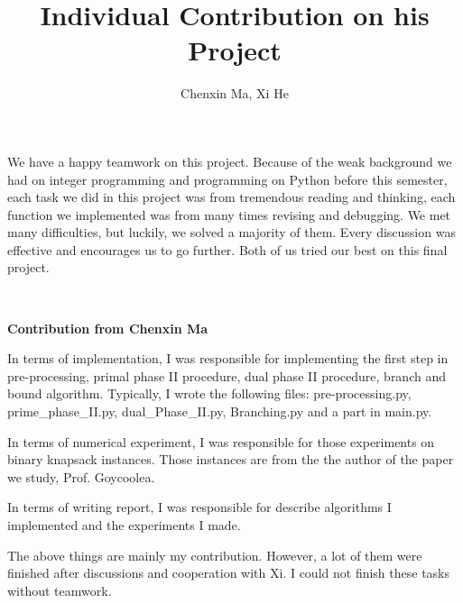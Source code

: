 \documentclass[a4paper,10pt]{article}
\title{Individual Contribution on his Project}
\author{Chenxin Ma, Xi He}
\begin{document}
\maketitle
 
We have a happy teamwork on this project. Because of the weak background we had on integer programming and programming on Python before this semester, each task we did in this project was from tremendous reading and thinking, each function we implemented was from many times revising and debugging. We met many difficulties, but luckily, we solved a majority of them. Every discussion was effective and encourages us to go further.  Both of us tried our best on this final project.   

~\\
\centerline{\textbf{Contribution from Chenxin Ma}}

In terms of implementation, I was responsible for implementing the first step in pre-processing, primal phase II procedure, dual phase II procedure, branch and bound algorithm. Typically, I wrote the following files: pre-processing.py, prime\_phase\_II.py, dual\_Phase\_II.py, Branching.py and a part in main.py. 

In terms of numerical experiment, I was responsible for those experiments on binary knapsack instances. Those instances are from the the author of the paper we study, Prof. Goycoolea. 

In terms of writing report, I was responsible for describe algorithms I implemented and the experiments I made. 

The above things are mainly my contribution. However, a lot of them were finished after discussions and cooperation with Xi. I could not finish these tasks without teamwork. 
 
\end{document}
